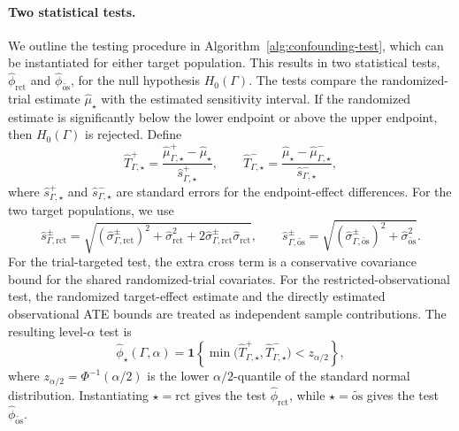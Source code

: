 \paragraph{Two statistical tests.}
We outline the testing procedure in Algorithm~\ref{alg:confounding-test}, which can be instantiated for either target population. This results in two statistical tests, \(\widehat{\phi}_{\mathrm{rct}}\) and \(\widehat{\phi}_{\widetilde{\mathrm{os}}}\), for the null hypothesis \(H_0(\Gamma)\). The tests compare the randomized-trial estimate \(\widehat{\mu}_{\star}\) with the estimated sensitivity interval. If the randomized estimate is significantly below the lower endpoint or above the upper endpoint, then \(H_0(\Gamma)\) is rejected. Define
\[
  \widehat{T}^+_{\Gamma,\star}
  =
  \frac{
    \widehat{\mu}^+_{\Gamma,\star}
    -
    \widehat{\mu}_{\star}
  }{
    \widehat{s}^+_{\Gamma,\star}
  },
  \qquad
  \widehat{T}^-_{\Gamma,\star}
  =
  \frac{
    \widehat{\mu}_{\star}
    -
    \widehat{\mu}^-_{\Gamma,\star}
  }{
    \widehat{s}^-_{\Gamma,\star}
  },
\]
where \(\widehat{s}^+_{\Gamma,\star}\) and \(\widehat{s}^-_{\Gamma,\star}\) are standard errors for the endpoint-effect differences. For the two target populations, we use
\[
  \widehat{s}^\pm_{\Gamma,\mathrm{rct}}
  =
  \sqrt{
    (\widehat{\sigma}^\pm_{\Gamma,\mathrm{rct}})^2
    +
    \widehat{\sigma}_{\mathrm{rct}}^2
    +
    2\widehat{\sigma}^\pm_{\Gamma,\mathrm{rct}}\widehat{\sigma}_{\mathrm{rct}}
  },
  \qquad
  \widehat{s}^\pm_{\Gamma,\widetilde{\mathrm{os}}}
  =
  \sqrt{
    (\widehat{\sigma}^\pm_{\Gamma,\widetilde{\mathrm{os}}})^2
    +
    \widehat{\sigma}_{\widetilde{\mathrm{os}}}^2
  }.
\]
For the trial-targeted test, the extra cross term is a conservative covariance bound for the shared randomized-trial covariates. For the restricted-observational test, the randomized target-effect estimate and the directly estimated observational ATE bounds are treated as independent sample contributions.
The resulting level-\(\alpha\) test is
\[
  \widehat{\phi}_{\star}(\Gamma,\alpha)
  =
  \mathbf{1}
  \left\{
    \min\bigl(
      \widehat{T}^+_{\Gamma,\star},
      \widehat{T}^-_{\Gamma,\star}
    \bigr)
    <
    z_{\alpha/2}
  \right\},
\]
where \(z_{\alpha/2}=\Phi^{-1}(\alpha/2)\) is the lower \(\alpha/2\)-quantile of the standard normal distribution. Instantiating \(\star=\mathrm{rct}\) gives the test \(\widehat{\phi}_{\mathrm{rct}}\), while \(\star=\widetilde{\mathrm{os}}\) gives the test \(\widehat{\phi}_{\widetilde{\mathrm{os}}}\).

